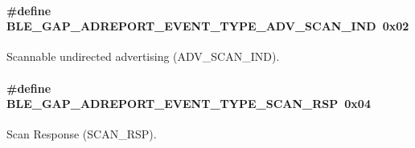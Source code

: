 \paragraph[{\texorpdfstring{B\+L\+E\+\_\+\+G\+A\+P\+\_\+\+A\+D\+R\+E\+P\+O\+R\+T\+\_\+\+E\+V\+E\+N\+T\+\_\+\+T\+Y\+P\+E\+\_\+\+A\+D\+V\+\_\+\+S\+C\+A\+N\+\_\+\+I\+ND}{BLE_GAP_ADREPORT_EVENT_TYPE_ADV_SCAN_IND}}]{\setlength{\rightskip}{0pt plus 5cm}\#define B\+L\+E\+\_\+\+G\+A\+P\+\_\+\+A\+D\+R\+E\+P\+O\+R\+T\+\_\+\+E\+V\+E\+N\+T\+\_\+\+T\+Y\+P\+E\+\_\+\+A\+D\+V\+\_\+\+S\+C\+A\+N\+\_\+\+I\+ND~0x02}\hypertarget{group___b_l_e___g_a_p___a_d_r_e_p_o_r_t___e_v_e_n_t___t_y_p_e_gafa7c714a9a1e84a12bf953f42a290a47}{}\label{group___b_l_e___g_a_p___a_d_r_e_p_o_r_t___e_v_e_n_t___t_y_p_e_gafa7c714a9a1e84a12bf953f42a290a47}
Scannable undirected advertising (A\+D\+V\+\_\+\+S\+C\+A\+N\+\_\+\+I\+ND). 
\paragraph[{\texorpdfstring{B\+L\+E\+\_\+\+G\+A\+P\+\_\+\+A\+D\+R\+E\+P\+O\+R\+T\+\_\+\+E\+V\+E\+N\+T\+\_\+\+T\+Y\+P\+E\+\_\+\+S\+C\+A\+N\+\_\+\+R\+SP}{BLE_GAP_ADREPORT_EVENT_TYPE_SCAN_RSP}}]{\setlength{\rightskip}{0pt plus 5cm}\#define B\+L\+E\+\_\+\+G\+A\+P\+\_\+\+A\+D\+R\+E\+P\+O\+R\+T\+\_\+\+E\+V\+E\+N\+T\+\_\+\+T\+Y\+P\+E\+\_\+\+S\+C\+A\+N\+\_\+\+R\+SP~0x04}\hypertarget{group___b_l_e___g_a_p___a_d_r_e_p_o_r_t___e_v_e_n_t___t_y_p_e_ga41c1d44a55b98b7790ebb4020e1de75e}{}\label{group___b_l_e___g_a_p___a_d_r_e_p_o_r_t___e_v_e_n_t___t_y_p_e_ga41c1d44a55b98b7790ebb4020e1de75e}
Scan Response (S\+C\+A\+N\+\_\+\+R\+SP). 
